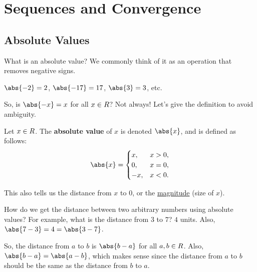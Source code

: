 \chapter{Sequences and Convergence}
\section{Absolute Values}
What is an absolute value? We commonly think of it as an operation that removes negative signs.
\begin{Example}{}{}
    $ \abs{-2}=2 $, $ \abs{-17}=17 $, $ \abs{3}=3 $, etc.
\end{Example}
So, is $ \abs{-x}=x $ for all $ x\in\relax{R}$? Not always! Let's give the definition to avoid ambiguity.
\begin{Definition}{}{}
    Let $ x\in\relax{R} $. The \textbf{absolute value} of $ x $ is denoted $ \abs{x} $,
    and is defined as follows:
    \[ \abs{x}=\begin{cases}
            x,  & x>0, \\
            0,  & x=0, \\
            -x, & x<0.
        \end{cases} \]
\end{Definition}
This also tells us the distance from $ x $ to $ 0 $, or the \underline{magnitude} (size of $ x $).
\begin{Example}{}{}
    How do we get the distance between two arbitrary numbers using absolute values? For example, what is
    the distance from $ 3 $ to $ 7 $? $ 4 $ units. Also, $ \abs{7-3}=4=\abs{3-7} $.
\end{Example}
So, the distance from $ a $ to $ b $ is $ \abs{b-a} $ for all $ a,b\in\relax{R} $. Also,
$ \abs{b-a}=\abs{a-b} $, which makes sense since the distance from $ a $ to $ b $ should be the same as
the distance from $ b $ to $ a $.
